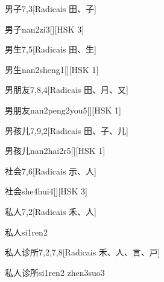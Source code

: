 \begin{entry}{男子}{7,3}[Radicais ⽥、⼦]
  \begin{phonetics}{男子}{nan2zi3}[][HSK 3]
  \end{phonetics}
\end{entry}

\begin{entry}{男生}{7,5}[Radicais ⽥、⽣]
  \begin{phonetics}{男生}{nan2sheng1}[][HSK 1]
  \end{phonetics}
\end{entry}

\begin{entry}{男朋友}{7,8,4}[Radicais ⽥、⽉、⼜]
  \begin{phonetics}{男朋友}{nan2peng2you5}[][HSK 1]
  \end{phonetics}
\end{entry}

\begin{entry}{男孩儿}{7,9,2}[Radicais ⽥、⼦、⼉]
  \begin{phonetics}{男孩儿}{nan2hai2r5}[][HSK 1]
  \end{phonetics}
\end{entry}

\begin{entry}{社会}{7,6}[Radicais ⽰、⼈]
  \begin{phonetics}{社会}{she4hui4}[][HSK 3]
  \end{phonetics}
\end{entry}

\begin{entry}{私人}{7,2}[Radicais ⽲、⼈]
  \begin{phonetics}{私人}{si1ren2}
  \end{phonetics}
\end{entry}

\begin{entry}{私人诊所}{7,2,7,8}[Radicais ⽲、⼈、⾔、⼾]
  \begin{phonetics}{私人诊所}{si1ren2 zhen3suo3}
  \end{phonetics}
\end{entry}

